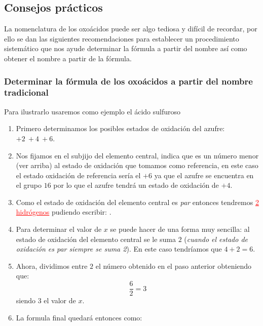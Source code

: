\documentclass[12pt]{article}
\begin{document}
\subsection{Consejos prácticos}

La nomenclatura de los oxoácidos puede ser algo tediosa y difícil de recordar, por ello se dan las siguientes recomendaciones para establecer un procedimiento sistemático que nos ayude determinar la fórmula a partir del nombre así como obtener el nombre a partir de la fórmula.

\subsubsection{Determinar la fórmula de los oxoácidos a partir del nombre tradicional}


Para ilustrarlo usaremos como ejemplo el ácido sulfuroso

\begin{enumerate}[label=\numberballgreen]
    \item Primero determinamos los posibles estados de oxidación del azufre: $+2\ +4\ +6$.
    \item Nos fijamos en el subjijo del elemento central,  indica que es un número menor (ver arriba) al estado de oxidación que tomamos como referencia, en este caso el estado oxidación de referencia sería el $+6$ ya que el azufre se encuentra en el grupo $16$ por lo que el azufre tendrá un estado de oxidación de $+4$.
    \item Como el estado de oxidación del elemento central es \textit{par} entonces tendremos \textcolor{red}{\uline{2 hidrógenos}} pudiendo escribir: .
    \item Para determinar el valor de $x$ se puede hacer de una forma muy sencilla: al estado de oxidación del elemento central se le suma $2$ (\textit{cuando el estado de oxidación es par siempre se suma 2}). En este caso tendríamos que $4 + 2 = 6$.
    \item Ahora, dividimos entre $2$ el número obtenido en el paso anterior obteniendo que:
          \[\frac{6}{2} = 3\]
          siendo $3$ el valor de $x$.
    \item La formula final quedará entonces como: 
\end{enumerate}

\end{document}
